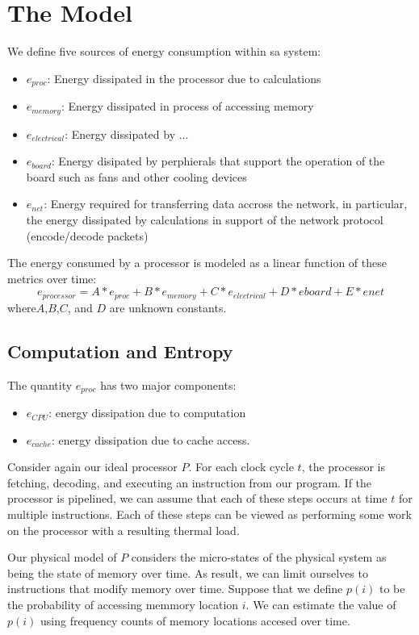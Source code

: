 \documentclass[times, 10pt,onecolumn]{article}
\begin{document}
\section{The Model}
\label{sec:model}
We define
five sources of energy consumption within sa system:
\begin{itemize}
\item $e_{proc}$: Energy dissipated in the processor due to calculations
\item $e_{memory}$: Energy dissipated in process of accessing memory
\item $e_{electrical}$: Energy dissipated by ... 
\item $e_{board}$: Energy disipated by perphierals that support the
  operation of the board such as fans and other cooling devices
\item $e_{net}$: Energy required for transferring data accross the
  network, in particular,  the energy dissipated by calculations in support
  of the network protocol (encode/decode packets)
\end{itemize}
The energy consumed by a processor is modeled as a linear function of these
metrics over time:
\begin{equation}
\label{eq:linmodel}
e_{processor}=  A*e_{proc}+B*e_{memory}+C*e_{electrical}+D*e{board}+E*e{net}
\end{equation}
where$A$,$B$,$C$, and $D$ are unknown constants. 

\subsection{Computation and Entropy}
\label{sec:cpuentropy}
The quantity $e_{proc}$ has two major components:
\begin{itemize}
\item $e_{CPU}$: energy dissipation due to computation
\item $e_{cache}$: energy dissipation due to cache access.
\end{itemize}
Consider again our ideal processor $P$.  For each clock cycle $t$, the
processor is fetching, decoding, and executing an instruction from our
program.  If the processor is pipelined, we can assume that each of
these steps occurs at time $t$ for multiple instructions.  Each of these
steps can be viewed as performing some work on the processor with a
resulting thermal load.

Our physical model of $P$ considers the micro-states of the physical system as
being the state of memory over time.  As result, we can limit ourselves to
instructions that modify memory over time. Suppose that we define $p(i)$ to be
the probability of accessing memmory location $i$.  We can estimate the value
of $p(i)$ using frequency counts of memory locations accesed over time.
\end{document}

